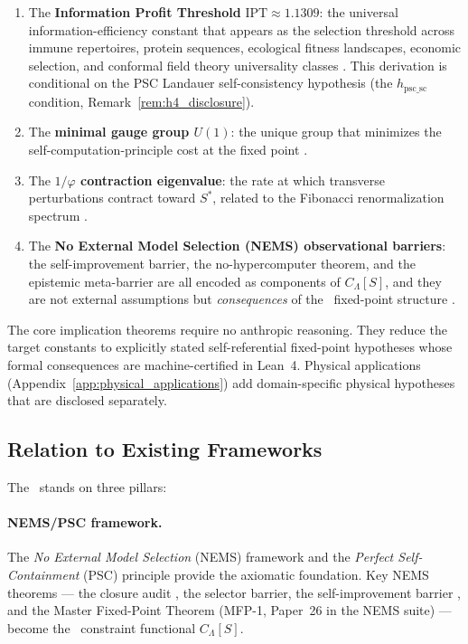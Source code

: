 \documentclass[11pt]{article}
\theoremstyle{remark}
\newcommand{\SRRG}{\text{SRRG}}
\newcommand{\IPT}{\mathrm{IPT}}
\newcommand{\Sstar}{S^*}
\newcommand{\goldenratio}{\varphi}
\begin{document}
\begin{enumerate}[leftmargin=2.5em]
\item The \textbf{Information Profit Threshold} $\IPT \approx 1.1309$: the universal
  information-efficiency constant that appears as the selection threshold across
  immune repertoires, protein sequences, ecological fitness landscapes, economic
  selection, and conformal field theory universality classes
  \cite{SpivackIPT,SpivackGeneralSelection}.
  This derivation is conditional on the PSC Landauer self-consistency hypothesis
  (the $h_{\mathrm{psc\_sc}}$ condition, Remark~\ref{rem:h4_disclosure}).

\item The \textbf{minimal gauge group $U(1)$}: the unique group that minimizes
  the self-computation-principle cost at the fixed point
  \cite{SpivackNEMS05,SpivackUGPFormalization}.

\item The \textbf{$1/\goldenratio$ contraction eigenvalue}: the rate at which
  transverse perturbations contract toward $\Sstar$, related to the Fibonacci
  renormalization spectrum \cite{Spivack2025UGP,ugp-lean}.

\item The \textbf{No External Model Selection (NEMS) observational barriers}: the self-improvement barrier, the
  no-hypercomputer theorem, and the epistemic meta-barrier are all encoded as
  components of $C_\Lambda[S]$, and they are not external assumptions but
  \emph{consequences} of the \SRRG\ fixed-point structure \cite{SpivackNEMSHub}.
\end{enumerate}

The core implication theorems require no anthropic reasoning. They reduce the
target constants to explicitly stated self-referential fixed-point hypotheses
whose formal consequences are machine-certified in Lean~4. Physical
applications (Appendix~\ref{app:physical_applications}) add domain-specific
physical hypotheses that are disclosed separately.

\subsection{Relation to Existing Frameworks}

The \SRRG\ stands on three pillars:

\paragraph{NEMS/PSC framework.} The \emph{No External Model Selection} (NEMS) framework
\cite{SpivackNEMS07} and the \emph{Perfect Self-Containment} (PSC) principle provide
the axiomatic foundation. Key NEMS theorems --- the closure audit \cite{SpivackNEMSHub},
the selector barrier, the self-improvement barrier \cite{SpivackNEMSHub}, and the
Master Fixed-Point Theorem (MFP-1, Paper~26 in the NEMS suite) --- become the
\SRRG\ constraint functional $C_\Lambda[S]$.
\end{document}
